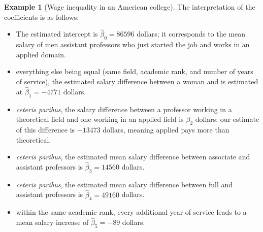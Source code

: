 \documentclass[
  11pt,
  letterpaper,
]{scrbook}
\providecommand{\tightlist}{%
  \setlength{\itemsep}{0pt}\setlength{\parskip}{0pt}}\usepackage{longtable,booktabs,array}
\theoremstyle{definition}
\theoremstyle{definition}
\newtheorem{example}{Example}[chapter]
\theoremstyle{plain}
\theoremstyle{plain}
\theoremstyle{remark}
\begin{document}
\begin{example}[Wage inequality in an American
college]
The interpretation of the coefficients is as follows:

\begin{itemize}
\tightlist
\item
  The estimated intercept is \(\widehat{\beta}_0=86596\) dollars; it
  corresponds to the mean salary of men assistant professors who just
  started the job and works in an applied domain.
\item
  everything else being equal (same field, academic rank, and number of
  years of service), the estimated salary difference between a woman and
  is estimated at \(\widehat{\beta}_1=-4771\) dollars.
\item
  \emph{ceteris paribus}, the salary difference between a professor
  working in a theoretical field and one working in an applied field is
  \(\beta_2\) dollars: our estimate of this difference is \(-13473\)
  dollars, meaning applied pays more than theoretical.
\item
  \emph{ceteris paribus}, the estimated mean salary difference between
  associate and assistant professors is \(\widehat{\beta}_3=14560\)
  dollars.
\item
  \emph{ceteris paribus}, the estimated mean salary difference between
  full and assistant professors is \(\widehat{\beta}_4=49160\) dollars.
\item
  within the same academic rank, every additional year of service leads
  to a mean salary increase of \(\widehat{\beta}_5=-89\) dollars.
\end{itemize}

\end{example}
\end{document}
